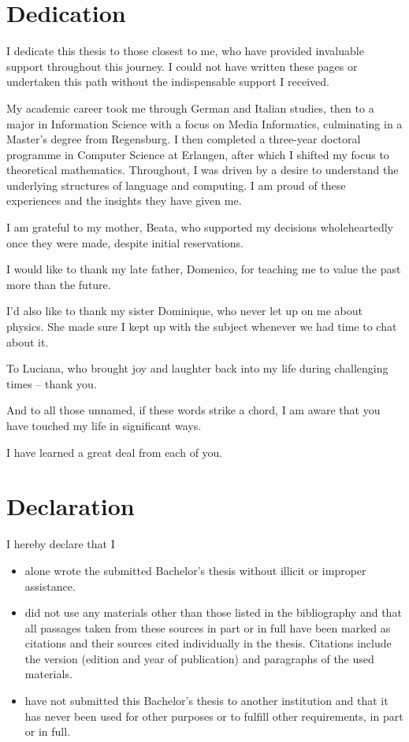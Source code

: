 \documentclass[b5paper, 11pt, twoside]{report}
\begin{document}
\chapter*{Dedication}
I dedicate this thesis to those closest to me, who have provided invaluable support throughout this journey. I could not have written these pages or undertaken this path without the indispensable support I received.

My academic career took me through German and Italian studies, then to a major in Information Science with a focus on Media Informatics, culminating in a Master's degree from Regensburg. I then completed a three-year doctoral programme in Computer Science at Erlangen, after which I shifted my focus to theoretical mathematics. Throughout, I was driven by a desire to understand the underlying structures of language and computing. I am proud of these experiences and the insights they have given me.

I am grateful to my mother, Beata, who supported my decisions wholeheartedly once they were made, despite initial reservations.

I would like to thank my late father, Domenico, for teaching me to value the past more than the future.

I'd also like to thank my sister Dominique, who never let up on me about physics. She made sure I kept up with the subject whenever we had time to chat about it.

To Luciana, who brought joy and laughter back into my life during challenging times -- thank you.

And to all those unnamed, if these words strike a chord, I am aware that you have touched my life in significant ways.

I have learned a great deal from each of you.

\chapter*{Declaration}
I hereby declare that I

\begin{itemize}
	\item alone wrote the submitted Bachelor's thesis without illicit or improper
	      assistance.
	      
	\item did not use any materials other than those listed in the bibliography and
	      that all passages taken from these sources in part or in full have been marked
	      as citations and their sources cited individually in the thesis. Citations
	      include the version (edition and year of publication) and paragraphs of the used materials.
	      
	\item have not submitted this Bachelor's thesis to another institution and that
	      it has never been used for other purposes or to fulfill other requirements,
	      in part or in full.
\end{itemize}
\end{document}
